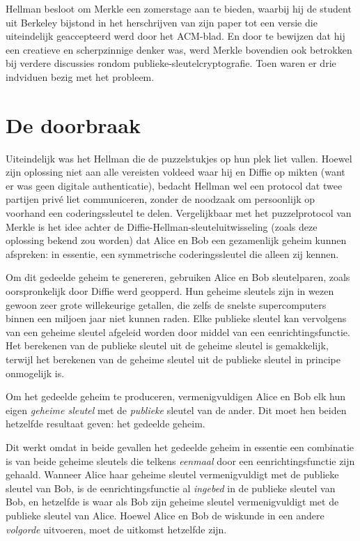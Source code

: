 \documentclass[
  a5paper,
  smalldemyvopaper,11pt,twoside,onecolumn,openright,extrafontsizes,
hidelinks]{memoir}
\begin{document}
Hellman besloot om Merkle een zomerstage aan te bieden, waarbij hij de
student uit Berkeley bijstond in het herschrijven van zijn paper tot een
versie die uiteindelijk geaccepteerd werd door het ACM-blad. En door te
bewijzen dat hij een creatieve en scherpzinnige denker was, werd Merkle
bovendien ook betrokken bij verdere discussies rondom
publieke-sleutelcryptografie. Toen waren er drie indviduen bezig met het probleem.

\vspace{-1em}
\section{De doorbraak}\label{de-doorbraak}

Uiteindelijk was het Hellman die de puzzelstukjes op hun plek liet
vallen. Hoewel zijn oplossing niet aan alle vereisten voldeed waar hij en Diffie
op mikten (want er was geen digitale authenticatie), bedacht Hellman wel
een protocol dat twee partijen privé liet communiceren, zonder de
noodzaak om persoonlijk op voorhand een coderingssleutel te delen.
Vergelijkbaar met het puzzelprotocol van Merkle is het idee achter de
Diffie-Hellman-sleuteluitwisseling (zoals deze oplossing bekend zou
worden) dat Alice en Bob een gezamenlijk geheim kunnen afspreken: in
essentie, een symmetrische coderingssleutel die alleen zij kennen.

Om dit gedeelde geheim te genereren, gebruiken Alice en Bob
sleutelparen, zoals oorspronkelijk door Diffie werd geopperd. Hun
geheime sleutels zijn in wezen gewoon zeer grote willekeurige getallen,
die zelfs de snelste supercomputers binnen een miljoen jaar niet kunnen
raden. Elke publieke sleutel kan vervolgens van een geheime sleutel
afgeleid worden door middel van een eenrichtingsfunctie. Het berekenen
van de publieke sleutel uit de geheime sleutel is gemakkelijk, terwijl
het berekenen van de geheime sleutel uit de publieke sleutel in principe
onmogelijk is.

Om het gedeelde geheim te produceren, vermenigvuldigen Alice en Bob elk
hun eigen \emph{geheime sleutel} met de \emph{publieke} sleutel van de
ander. Dit moet hen beiden hetzelfde resultaat geven: het gedeelde
geheim.

Dit werkt omdat in beide gevallen het gedeelde geheim in essentie een
combinatie is van beide geheime sleutels die telkens \emph{eenmaal} door
een eenrichtingsfunctie zijn gehaald. Wanneer Alice haar geheime sleutel
vermenigvuldigt met de publieke sleutel van Bob, is de
eenrichtingsfunctie al \emph{ingebed} in de publieke sleutel van Bob, en
hetzelfde is waar als Bob zijn geheime sleutel vermenigvuldigt met de
publieke sleutel van Alice. Hoewel Alice en Bob de wiskunde in een
andere \emph{volgorde} uitvoeren, moet de uitkomst hetzelfde zijn.
\end{document}
